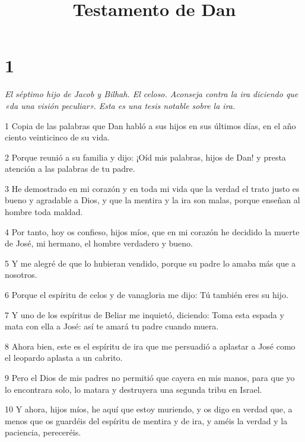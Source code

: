 

\title{Testamento de Dan}

\chapter{1}

\par \textit{El séptimo hijo de Jacob y Bilhah. El celoso. Aconseja contra la ira diciendo que «da una visión peculiar». Esta es una tesis notable sobre la ira.}

\par 1 Copia de las palabras que Dan habló a sus hijos en sus últimos días, en el año ciento veinticinco de su vida.

\par 2 Porque reunió a su familia y dijo: ¡Oíd mis palabras, hijos de Dan! y presta atención a las palabras de tu padre.

\par 3 He demostrado en mi corazón y en toda mi vida que la verdad el trato justo es bueno y agradable a Dios, y que la mentira y la ira son malas, porque enseñan al hombre toda maldad.

\par 4 Por tanto, hoy os confieso, hijos míos, que en mi corazón he decidido la muerte de José, mi hermano, el hombre verdadero y bueno.

\par 5 Y me alegré de que lo hubieran vendido, porque su padre lo amaba más que a nosotros.

\par 6 Porque el espíritu de celos y de vanagloria me dijo: Tú también eres su hijo.

\par 7 Y uno de los espíritus de Beliar me inquietó, diciendo: Toma esta espada y mata con ella a José: así te amará tu padre cuando muera.

\par 8 Ahora bien, este es el espíritu de ira que me persuadió a aplastar a José como el leopardo aplasta a un cabrito.

\par 9 Pero el Dios de mis padres no permitió que cayera en mis manos, para que yo lo encontrara solo, lo matara y destruyera una segunda tribu en Israel.

\par 10 Y ahora, hijos míos, he aquí que estoy muriendo, y os digo en verdad que, a menos que os guardéis del espíritu de mentira y de ira, y améis la verdad y la paciencia, pereceréis.

